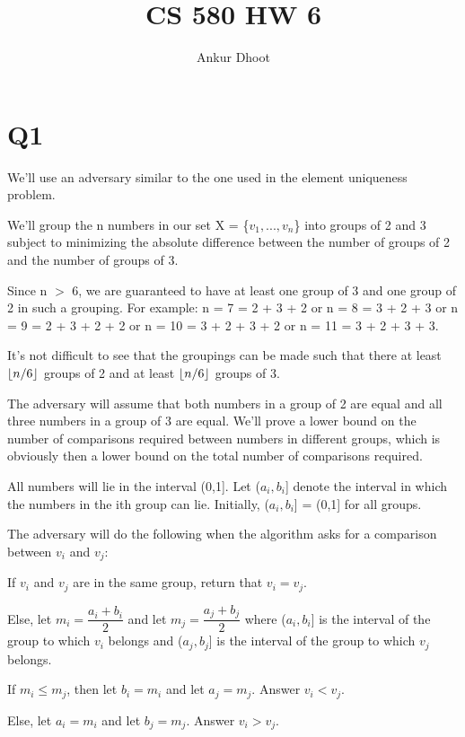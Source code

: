 \documentclass[11pt,a4paper]{article}
\DeclarePairedDelimiter\floor{\lfloor}{\rfloor}
\begin{document}
\author{Ankur Dhoot}
\title{CS 580 HW 6}
\maketitle

\section*{Q1}
We'll use an adversary similar to the one used in the element uniqueness problem. 

We'll group the n numbers in our set X = \{$v_{1},...,v_{n}$\} into groups of 2 and 3 subject to minimizing the absolute difference between the number of groups of 2 and the number of groups of 3.

Since n $>$ 6, we are guaranteed to have at least one group of 3 and one group of 2 in such a grouping. For example: n = 7 = 2 + 3 + 2 or n = 8 = 3 + 2 + 3 or n = 9 = 2 + 3 + 2 + 2 or n = 10 = 3 + 2 + 3 + 2 or n = 11 = 3 + 2 + 3 + 3.

It's not difficult to see that the groupings can be made such that there at least $\floor{n/6}$ groups of 2 and at least $\floor{n/6}$ groups of 3. 

The adversary will assume that both numbers in a group of 2 are equal and all three numbers in a group of 3 are equal. We'll prove a lower bound on the number of comparisons required between numbers in different groups, which is obviously then a lower bound on the total number of comparisons required. 

All numbers will lie in the interval (0,1]. Let ($a_{i}, b_{i}$] denote the interval in which the numbers in the ith group can lie. Initially, ($a_{i}, b_{i}$] = (0,1] for all groups.

The adversary will do the following when the algorithm asks for a comparison between $v_{i}$ and $v_{j}$:

If $v_{i}$ and $v_{j}$ are in the same group, return that $v_{i} = v_{j}$.

Else, let $m_{i} = \dfrac{a_{i} + b_{i}}{2}$ and let $m_{j} = \dfrac{a_{j} + b_{j}}{2}$ where ($a_{i}, b_{i}$] is the interval of the group to which $v_{i}$ belongs and ($a_{j}, b_{j}$] is the interval of the group to which $v_{j}$ belongs.

If $m_{i} \leq m_{j}$, then let $b_{i} = m_{i}$ and let $a_{j} = m_{j}$. Answer $v_{i} < v_{j}$.

Else, let $a_{i} = m_{i}$ and let $b_{j} = m_{j}$. Answer $v_{i} > v_{j}$. 
\end{document}
